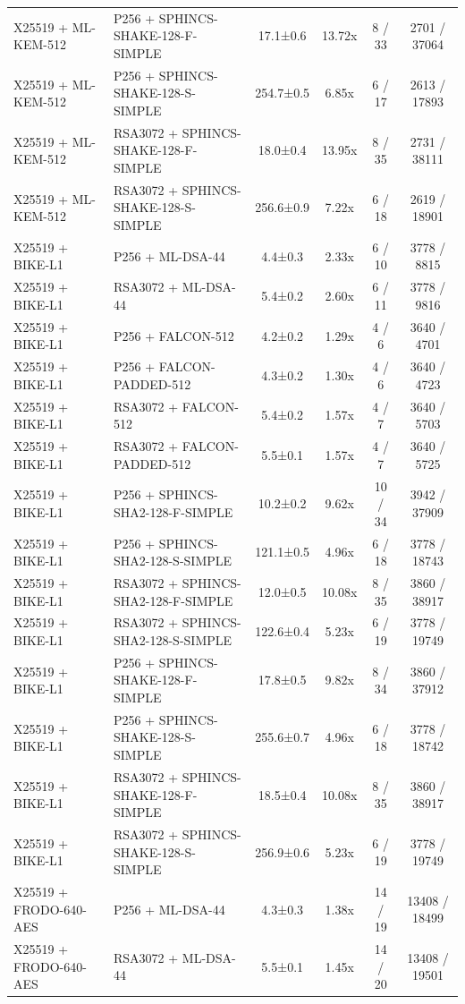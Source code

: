 \documentclass[10pt]{article}
\begin{document}
\begin{tabular}{@{}l l c c c c@{}}
X25519 + ML-KEM-512 & P256 + SPHINCS-SHAKE-128-F-SIMPLE & 17.1±0.6 & 13.72x & 8 / 33 & 2701 / 37064 \\
X25519 + ML-KEM-512 & P256 + SPHINCS-SHAKE-128-S-SIMPLE & 254.7±0.5 & 6.85x & 6 / 17 & 2613 / 17893 \\
X25519 + ML-KEM-512 & RSA3072 + SPHINCS-SHAKE-128-F-SIMPLE & 18.0±0.4 & 13.95x & 8 / 35 & 2731 / 38111 \\
X25519 + ML-KEM-512 & RSA3072 + SPHINCS-SHAKE-128-S-SIMPLE & 256.6±0.9 & 7.22x & 6 / 18 & 2619 / 18901 \\
X25519 + BIKE-L1 & P256 + ML-DSA-44 & 4.4±0.3 & 2.33x & 6 / 10 & 3778 / 8815 \\
X25519 + BIKE-L1 & RSA3072 + ML-DSA-44 & 5.4±0.2 & 2.60x & 6 / 11 & 3778 / 9816 \\
X25519 + BIKE-L1 & P256 + FALCON-512 & 4.2±0.2 & 1.29x & 4 / 6 & 3640 / 4701 \\
X25519 + BIKE-L1 & P256 + FALCON-PADDED-512 & 4.3±0.2 & 1.30x & 4 / 6 & 3640 / 4723 \\
X25519 + BIKE-L1 & RSA3072 + FALCON-512 & 5.4±0.2 & 1.57x & 4 / 7 & 3640 / 5703 \\
X25519 + BIKE-L1 & RSA3072 + FALCON-PADDED-512 & 5.5±0.1 & 1.57x & 4 / 7 & 3640 / 5725 \\
X25519 + BIKE-L1 & P256 + SPHINCS-SHA2-128-F-SIMPLE & 10.2±0.2 & 9.62x & 10 / 34 & 3942 / 37909 \\
X25519 + BIKE-L1 & P256 + SPHINCS-SHA2-128-S-SIMPLE & 121.1±0.5 & 4.96x & 6 / 18 & 3778 / 18743 \\
X25519 + BIKE-L1 & RSA3072 + SPHINCS-SHA2-128-F-SIMPLE & 12.0±0.5 & 10.08x & 8 / 35 & 3860 / 38917 \\
X25519 + BIKE-L1 & RSA3072 + SPHINCS-SHA2-128-S-SIMPLE & 122.6±0.4 & 5.23x & 6 / 19 & 3778 / 19749 \\
X25519 + BIKE-L1 & P256 + SPHINCS-SHAKE-128-F-SIMPLE & 17.8±0.5 & 9.82x & 8 / 34 & 3860 / 37912 \\
X25519 + BIKE-L1 & P256 + SPHINCS-SHAKE-128-S-SIMPLE & 255.6±0.7 & 4.96x & 6 / 18 & 3778 / 18742 \\
X25519 + BIKE-L1 & RSA3072 + SPHINCS-SHAKE-128-F-SIMPLE & 18.5±0.4 & 10.08x & 8 / 35 & 3860 / 38917 \\
X25519 + BIKE-L1 & RSA3072 + SPHINCS-SHAKE-128-S-SIMPLE & 256.9±0.6 & 5.23x & 6 / 19 & 3778 / 19749 \\
X25519 + FRODO-640-AES & P256 + ML-DSA-44 & 4.3±0.3 & 1.38x & 14 / 19 & 13408 / 18499 \\
X25519 + FRODO-640-AES & RSA3072 + ML-DSA-44 & 5.5±0.1 & 1.45x & 14 / 20 & 13408 / 19501 \\

\end{tabular}
\end{document}
